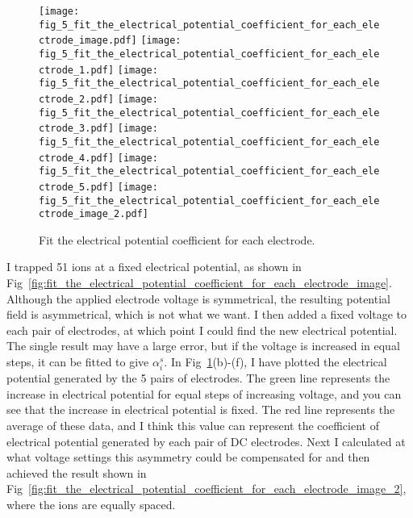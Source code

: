 \begin{figure}
    \centering
    \subcaptionbox{\label{fig:fit_the_electrical_potential_coefficient_for_each_electrode_image}}
    {\texttt{[image: fig\_5\_fit\_the\_electrical\_potential\_coefficient\_for\_each\_electrode\_image.pdf]}}
    \subcaptionbox{\label{fig:fit_the_electrical_potential_coefficient_for_each_electrode_1}}
    {\texttt{[image: fig\_5\_fit\_the\_electrical\_potential\_coefficient\_for\_each\_electrode\_1.pdf]}}
    \subcaptionbox{\label{fig:fit_the_electrical_potential_coefficient_for_each_electrode_2}}
    {\texttt{[image: fig\_5\_fit\_the\_electrical\_potential\_coefficient\_for\_each\_electrode\_2.pdf]}}
    \subcaptionbox{\label{fig:fit_the_electrical_potential_coefficient_for_each_electrode_3}}
    {\texttt{[image: fig\_5\_fit\_the\_electrical\_potential\_coefficient\_for\_each\_electrode\_3.pdf]}}
    \subcaptionbox{\label{fig:fit_the_electrical_potential_coefficient_for_each_electrode_4}}
    {\texttt{[image: fig\_5\_fit\_the\_electrical\_potential\_coefficient\_for\_each\_electrode\_4.pdf]}}
    \subcaptionbox{\label{fig:fit_the_electrical_potential_coefficient_for_each_electrode_5}}
    {\texttt{[image: fig\_5\_fit\_the\_electrical\_potential\_coefficient\_for\_each\_electrode\_5.pdf]}}
    \subcaptionbox{\label{fig:fit_the_electrical_potential_coefficient_for_each_electrode_image_2}}
    {\texttt{[image: fig\_5\_fit\_the\_electrical\_potential\_coefficient\_for\_each\_electrode\_image\_2.pdf]}}
    \caption{Fit the electrical potential coefficient for each electrode.}
    \label{fig:fit_the_electrical_potential_coefficient_for_each_electrode}
\end{figure}

I trapped 51 ions at a fixed electrical potential, as shown in Fig~\ref{fig:fit_the_electrical_potential_coefficient_for_each_electrode_image}. Although the applied electrode voltage is symmetrical, the resulting potential field is asymmetrical, which is not what we want. I then added a fixed voltage to each pair of electrodes, at which point I could find the new electrical potential. The single result may have a large error, but if the voltage is increased in equal steps, it can be fitted to give $\alpha_i^s$. In Fig~\ref{fig:fit_the_electrical_potential_coefficient_for_each_electrode}(b)-(f), I have plotted the electrical potential generated by the 5 pairs of electrodes. The green line represents the increase in electrical potential for equal steps of increasing voltage, and you can see that the increase in electrical potential is fixed. The red line represents the average of these data, and I think this value can represent the coefficient of electrical potential generated by each pair of DC electrodes. Next I calculated at what voltage settings this asymmetry could be compensated for and then achieved the result shown in Fig~\ref{fig:fit_the_electrical_potential_coefficient_for_each_electrode_image_2}, where the ions are equally spaced.



